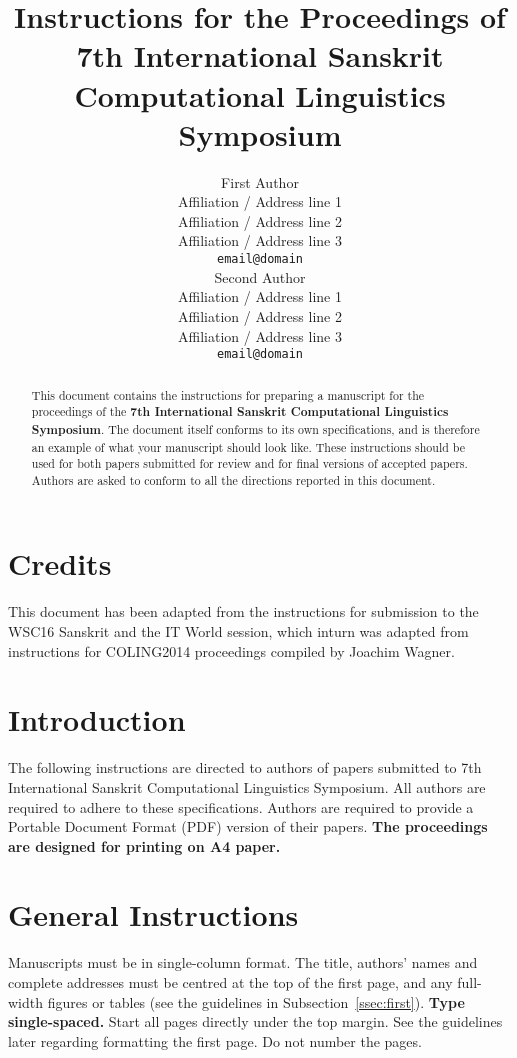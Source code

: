 \documentclass[11pt]{article}
\title{Instructions for the Proceedings of \\7th International Sanskrit Computational Linguistics Symposium}
\author{First Author \\
  Affiliation / Address line 1 \\
  Affiliation / Address line 2 \\
  Affiliation / Address line 3 \\
  {\tt email@domain} \\\And
  Second Author \\
  Affiliation / Address line 1 \\
  Affiliation / Address line 2 \\
  Affiliation / Address line 3 \\
  {\tt email@domain} \\}
\date{}
\begin{document}
\maketitle
\begin{abstract}
  This document contains the instructions for preparing a
  manuscript for the proceedings of the \textbf{7th International Sanskrit Computational Linguistics Symposium}.
  The document itself
  conforms to its own specifications, and is therefore an example of
  what your manuscript should look like. These instructions should be
  used for both papers submitted for review and for final versions of
  accepted papers.  Authors are asked to conform to all the directions
  reported in this document.
\end{abstract}

\section{Credits}

This document has been adapted from the instructions for submission to the WSC16 Sanskrit
and the IT World session, which inturn was adapted from instructions for  COLING2014
proceedings compiled by Joachim Wagner.

\section{Introduction}
\label{intro}

%
%
\blfootnote{
}

The following instructions are directed to authors of papers submitted
to 7th International Sanskrit Computational Linguistics Symposium.  All
authors are required to adhere to these specifications. Authors are
required to provide a Portable Document Format (PDF) version of their
papers. \textbf{The proceedings are designed for printing on A4
  paper.}

\section{General Instructions}

Manuscripts must be in single-column format.
The title, authors' names and complete
addresses
must be centred at the top of the first page, and
any full-width figures or tables (see the guidelines in
Subsection~\ref{ssec:first}). {\bf Type single-spaced.}  Start all
pages directly under the top margin. See the guidelines later
regarding formatting the first page.
Do not number the pages.
\end{document}
